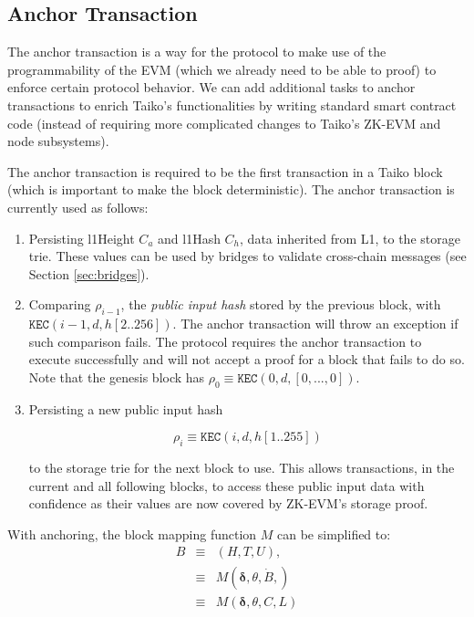 \documentclass[9pt,oneside]{amsart}
\begin{document}
\begin{multicols}{2}
\subsection{Anchor Transaction} \label{sec:anchoring}

The anchor transaction is a way for the protocol to make use of the programmability of the EVM (which we already need to be able to proof) to enforce certain protocol behavior. We can add additional tasks to anchor transactions to enrich Taiko's functionalities by writing standard smart contract code (instead of requiring more complicated changes to Taiko's ZK-EVM and node subsystems).

The anchor transaction is required to be the first transaction in a Taiko block (which is important to make the block deterministic). The anchor transaction is currently used as follows:

\begin{enumerate}
\item Persisting l1Height $C_a$ and l1Hash $C_h$, data inherited from L1, to the storage trie. These values can be used by bridges to validate cross-chain messages (see Section \ref{sec:bridges}).
\item Comparing $\rho_{i-1}$, the \textit{public input hash} stored by the previous block, with $\texttt{KEC}(i-1, d, h[2..256])$. The anchor transaction will throw an exception if such comparison fails. The protocol requires the anchor transaction to execute successfully and will not accept a proof for a block that fails to do so. Note that the genesis block has $\rho_0 \equiv \texttt{KEC}(0, d, [0,...,0])$.
\item Persisting a new public input hash

$$\rho_i \equiv \texttt{KEC}(i, d, h[1..255])$$ 

to the storage trie for the next block to use. This allows transactions, in the current and all following blocks, to access these public input data with confidence as their values are now covered by ZK-EVM's storage proof.
\end{enumerate}

With anchoring, the block mapping function $M$ can be simplified to:
\begin{eqnarray}
B & \equiv & (H, T, U), \\
\nonumber & \equiv &  M(\boldsymbol{\delta}, \theta, \dot{B}, )  \\
\nonumber & \equiv & M(\boldsymbol{\delta},  \theta, C, L)
\end{eqnarray}


\end{multicols}
\end{document}
